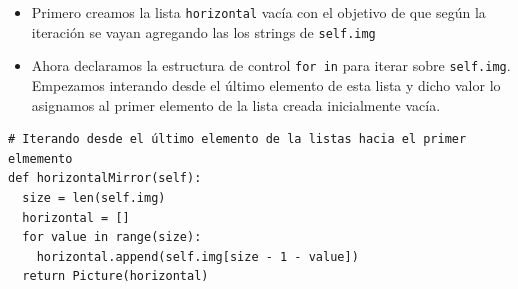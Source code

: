 \documentclass[10pt, a4paper]{article}
\newcommand{\mintpython}[1]{\texttt{#1}}
\begin{document}
\begin{itemize}
  \item Primero creamos la lista \mintpython{horizontal} vacía con el objetivo de que según la iteración se vayan agregando las los strings de \mintpython{self.img}
  \item Ahora declaramos la estructura de control \mintpython{for in} para iterar sobre \mintpython{self.img}. Empezamos interando desde el último elemento de esta lista y dicho valor lo asignamos al primer elemento de la lista creada inicialmente vacía.
\end{itemize}

\begin{verbatim}
# Iterando desde el último elemento de la listas hacia el primer elmemento
def horizontalMirror(self):
  size = len(self.img)
  horizontal = []
  for value in range(size):
    horizontal.append(self.img[size - 1 - value])
  return Picture(horizontal)
\end{verbatim}

\subsection{}
\subsection{}
\subsection{}
\subsection{}
\subsection{}
\subsection{}
\subsection{}
\subsection{}
\subsection{}
\end{document}
